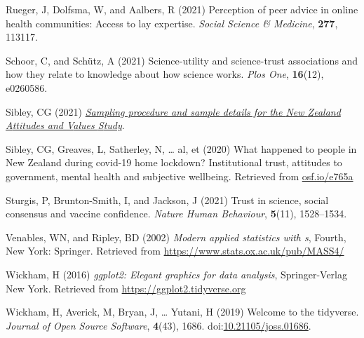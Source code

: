 \documentclass[
  single column]{article}
\newlength{\cslhangindent}
\newenvironment{CSLReferences}[2] %
 {\begin{list}{}{%
  \setlength{\itemindent}{0pt}
  \setlength{\leftmargin}{0pt}
  \setlength{\parsep}{0pt}
  \ifodd #1
   \setlength{\leftmargin}{\cslhangindent}
   \setlength{\itemindent}{-1\cslhangindent}
  \fi
  \setlength{\itemsep}{#2\baselineskip}}}
 {\end{list}}
\begin{document}
\begin{CSLReferences}{1}{0}
Rueger, J, Dolfsma, W, and Aalbers, R (2021) Perception of peer advice
in online health communities: Access to lay expertise. \emph{Social
Science \& Medicine}, \textbf{277}, 113117.

Schoor, C, and Schütz, A (2021) Science-utility and science-trust
associations and how they relate to knowledge about how science works.
\emph{Plos One}, \textbf{16}(12), e0260586.

Sibley, CG (2021)
\emph{\href{https://doi.org/10.31234/osf.io/wgqvy}{Sampling procedure
and sample details for the {N}ew {Z}ealand {A}ttitudes and {V}alues
{S}tudy}}.

Sibley, CG, Greaves, L, Satherley, N, \ldots{} al, et (2020) What
happened to people in {N}ew {Z}ealand during covid-19 home lockdown?
Institutional trust, attitudes to government, mental health and
subjective wellbeing. Retrieved from
\href{https://osf.io/e765a}{osf.io/e765a}

Sturgis, P, Brunton-Smith, I, and Jackson, J (2021) Trust in science,
social consensus and vaccine confidence. \emph{Nature Human Behaviour},
\textbf{5}(11), 1528--1534.

Venables, WN, and Ripley, BD (2002) \emph{Modern applied statistics with
s}, Fourth, New York: Springer. Retrieved from
\url{https://www.stats.ox.ac.uk/pub/MASS4/}

Wickham, H (2016) \emph{ggplot2: Elegant graphics for data analysis},
Springer-Verlag New York. Retrieved from
\url{https://ggplot2.tidyverse.org}

Wickham, H, Averick, M, Bryan, J, \ldots{} Yutani, H (2019) Welcome to
the {tidyverse}. \emph{Journal of Open Source Software}, \textbf{4}(43),
1686.
doi:\href{https://doi.org/10.21105/joss.01686}{10.21105/joss.01686}.

\end{CSLReferences}
\end{document}
